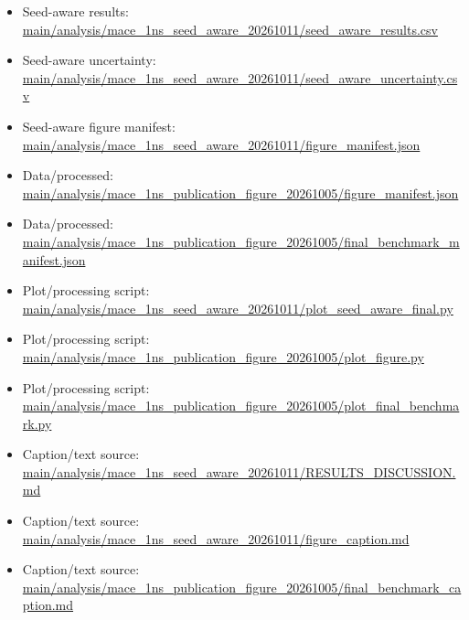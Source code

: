 \begin{itemize}[leftmargin=1.4em,noitemsep]
\item Seed-aware results: \begingroup\scriptsize\url{main/analysis/mace_1ns_seed_aware_20261011/seed_aware_results.csv}\endgroup
\item Seed-aware uncertainty: \begingroup\scriptsize\url{main/analysis/mace_1ns_seed_aware_20261011/seed_aware_uncertainty.csv}\endgroup
\item Seed-aware figure manifest: \begingroup\scriptsize\url{main/analysis/mace_1ns_seed_aware_20261011/figure_manifest.json}\endgroup
\item Data/processed: \begingroup\scriptsize\url{main/analysis/mace_1ns_publication_figure_20261005/figure_manifest.json}\endgroup
\item Data/processed: \begingroup\scriptsize\url{main/analysis/mace_1ns_publication_figure_20261005/final_benchmark_manifest.json}\endgroup
\item Plot/processing script: \begingroup\scriptsize\url{main/analysis/mace_1ns_seed_aware_20261011/plot_seed_aware_final.py}\endgroup
\item Plot/processing script: \begingroup\scriptsize\url{main/analysis/mace_1ns_publication_figure_20261005/plot_figure.py}\endgroup
\item Plot/processing script: \begingroup\scriptsize\url{main/analysis/mace_1ns_publication_figure_20261005/plot_final_benchmark.py}\endgroup
\item Caption/text source: \begingroup\scriptsize\url{main/analysis/mace_1ns_seed_aware_20261011/RESULTS_DISCUSSION.md}\endgroup
\item Caption/text source: \begingroup\scriptsize\url{main/analysis/mace_1ns_seed_aware_20261011/figure_caption.md}\endgroup
\item Caption/text source: \begingroup\scriptsize\url{main/analysis/mace_1ns_publication_figure_20261005/final_benchmark_caption.md}\endgroup
\end{itemize}

